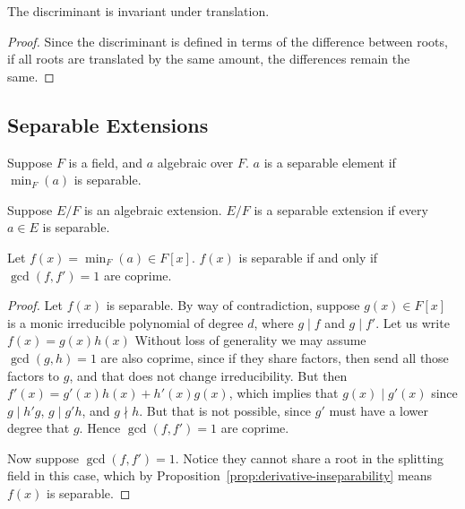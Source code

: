 \begin{proposition}\label{prop:discriminant-invariant}
    The discriminant is invariant under translation.
\end{proposition}
\begin{proof}
    Since the discriminant is defined in terms of the difference between roots,
    if all roots are translated by the same amount,
    the differences remain the same.
\end{proof}

\subsection*{Separable Extensions}

\begin{definition}
    Suppose \(F\) is a field, and \(a\) algebraic over \(F\).
    \(a\) is a separable element if \(\min_F(a)\) is separable.
\end{definition}
\begin{definition}
    Suppose \(E/F\) is an algebraic extension.
    \(E/F\) is a separable extension if every \(a \in E\) is separable.
\end{definition}

\begin{lemma}
    Let \(f(x) = \min_F(a) \in F[x]\).
    \(f(x)\) is separable if and only if \(\gcd(f,f') = 1\) are coprime.
\end{lemma}
\begin{proof}
    Let \(f(x)\) is separable.
    By way of contradiction,
    suppose \(g(x) \in F[x]\) is a monic irreducible polynomial of degree \(d\),
    where \(g \mid f\) and \(g \mid f'\).
    Let us write \(f(x) = g(x)h(x)\)
    Without loss of generality we may assume \(\gcd(g,h) = 1\) are also coprime,
    since if they share factors, then send all those factors to \(g\),
    and that does not change irreducibility.
    But then \(f'(x) = g'(x)h(x) + h'(x)g(x)\),
    which implies that \(g(x) \mid g'(x)\)
    since \(g \mid h'g\), \(g \mid g'h\), and \(g \nmid h\).
    But that is not possible, since \(g'\) must have a lower degree that \(g\).
    Hence \(\gcd(f,f') = 1\) are coprime.

    Now suppose \(\gcd(f,f') = 1\).
    Notice they cannot share a root in the splitting field in this case,
    which by Proposition~\ref{prop:derivative-inseparability}
    means \(f(x)\) is separable.
\end{proof}

